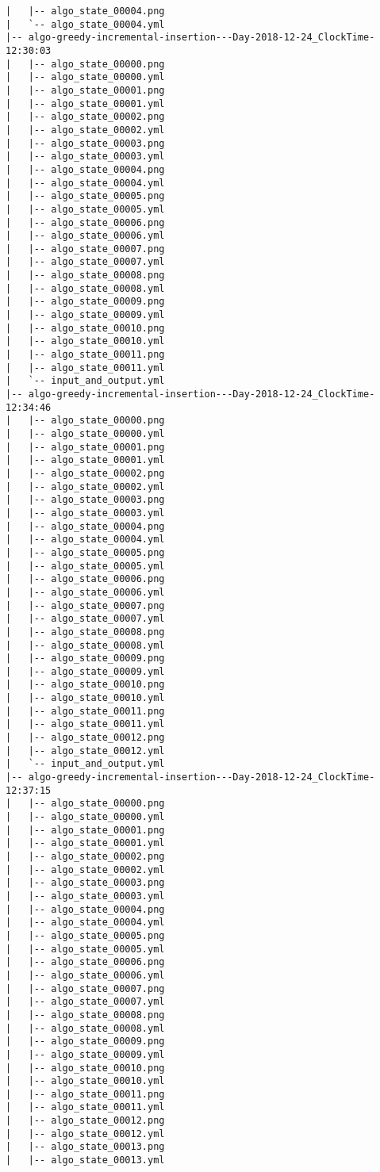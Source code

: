 \begin{verbatim}
|   |-- algo_state_00004.png
|   `-- algo_state_00004.yml
|-- algo-greedy-incremental-insertion---Day-2018-12-24_ClockTime-12:30:03
|   |-- algo_state_00000.png
|   |-- algo_state_00000.yml
|   |-- algo_state_00001.png
|   |-- algo_state_00001.yml
|   |-- algo_state_00002.png
|   |-- algo_state_00002.yml
|   |-- algo_state_00003.png
|   |-- algo_state_00003.yml
|   |-- algo_state_00004.png
|   |-- algo_state_00004.yml
|   |-- algo_state_00005.png
|   |-- algo_state_00005.yml
|   |-- algo_state_00006.png
|   |-- algo_state_00006.yml
|   |-- algo_state_00007.png
|   |-- algo_state_00007.yml
|   |-- algo_state_00008.png
|   |-- algo_state_00008.yml
|   |-- algo_state_00009.png
|   |-- algo_state_00009.yml
|   |-- algo_state_00010.png
|   |-- algo_state_00010.yml
|   |-- algo_state_00011.png
|   |-- algo_state_00011.yml
|   `-- input_and_output.yml
|-- algo-greedy-incremental-insertion---Day-2018-12-24_ClockTime-12:34:46
|   |-- algo_state_00000.png
|   |-- algo_state_00000.yml
|   |-- algo_state_00001.png
|   |-- algo_state_00001.yml
|   |-- algo_state_00002.png
|   |-- algo_state_00002.yml
|   |-- algo_state_00003.png
|   |-- algo_state_00003.yml
|   |-- algo_state_00004.png
|   |-- algo_state_00004.yml
|   |-- algo_state_00005.png
|   |-- algo_state_00005.yml
|   |-- algo_state_00006.png
|   |-- algo_state_00006.yml
|   |-- algo_state_00007.png
|   |-- algo_state_00007.yml
|   |-- algo_state_00008.png
|   |-- algo_state_00008.yml
|   |-- algo_state_00009.png
|   |-- algo_state_00009.yml
|   |-- algo_state_00010.png
|   |-- algo_state_00010.yml
|   |-- algo_state_00011.png
|   |-- algo_state_00011.yml
|   |-- algo_state_00012.png
|   |-- algo_state_00012.yml
|   `-- input_and_output.yml
|-- algo-greedy-incremental-insertion---Day-2018-12-24_ClockTime-12:37:15
|   |-- algo_state_00000.png
|   |-- algo_state_00000.yml
|   |-- algo_state_00001.png
|   |-- algo_state_00001.yml
|   |-- algo_state_00002.png
|   |-- algo_state_00002.yml
|   |-- algo_state_00003.png
|   |-- algo_state_00003.yml
|   |-- algo_state_00004.png
|   |-- algo_state_00004.yml
|   |-- algo_state_00005.png
|   |-- algo_state_00005.yml
|   |-- algo_state_00006.png
|   |-- algo_state_00006.yml
|   |-- algo_state_00007.png
|   |-- algo_state_00007.yml
|   |-- algo_state_00008.png
|   |-- algo_state_00008.yml
|   |-- algo_state_00009.png
|   |-- algo_state_00009.yml
|   |-- algo_state_00010.png
|   |-- algo_state_00010.yml
|   |-- algo_state_00011.png
|   |-- algo_state_00011.yml
|   |-- algo_state_00012.png
|   |-- algo_state_00012.yml
|   |-- algo_state_00013.png
|   |-- algo_state_00013.yml

\end{verbatim}
